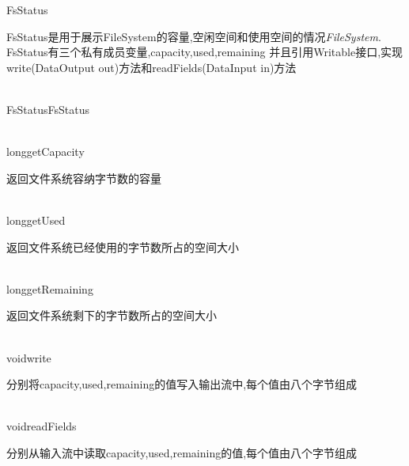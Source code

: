\begin{XeClass}{FsStatus}
   
 FsStatus是用于展示FileSystem的容量,空闲空间和使用空间的情况\emph{FileSystem}.
 FsStatus有三个私有成员变量,capacity,used,remaining
 并且引用Writable接口,实现write(DataOutput out)方法和readFields(DataInput in)方法

  \begin{XeMethod}{\XePublic\\ }{FsStatus}{FsStatus}
       

  \end{XeMethod}

  \begin{XeMethod}{\XePublic\\ }{long}{getCapacity}
       
 返回文件系统容纳字节数的容量

  \end{XeMethod}

  \begin{XeMethod}{\XePublic\\ }{long}{getUsed}
       
 返回文件系统已经使用的字节数所占的空间大小

  \end{XeMethod}

  \begin{XeMethod}{\XePublic\\ }{long}{getRemaining}
       
 返回文件系统剩下的字节数所占的空间大小

  \end{XeMethod}

  \begin{XeMethod}{\XePublic\\ }{void}{write}
       
 分别将capacity,used,remaining的值写入输出流中,每个值由八个字节组成

  \end{XeMethod}

  \begin{XeMethod}{\XePublic\\ }{void}{readFields}
       
 分别从输入流中读取capacity,used,remaining的值,每个值由八个字节组成

  \end{XeMethod}

\end{XeClass}
